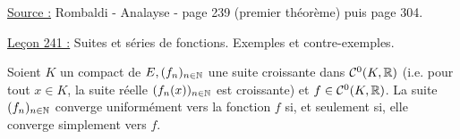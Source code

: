

\pagestyle{fancy}

\fancyhead[R]{}



\underline{Source :} Rombaldi - Analayse - page 239 (premier théorème) puis page 304. \newline

\underline{Leçon 241 :} Suites et séries de fonctions. Exemples et contre-exemples. \newline

\begin{thm}
\label{thm:Dini}
Soient $K$ un compact de $E, (f_n)_{n \in \mathbb{N}}$ une suite croissante dans $\mathcal{C}^0(K, \mathbb{R})$ 
(i.e. pour tout $x \in K$, la suite réelle $(f_n(x))_{n \in \mathbb{N}}$ est croissante) et $f \in \mathcal{C}^0(K, \mathbb{R})$. 
La suite $(f_n)_{n \in \mathbb{N}}$ converge uniformément vers la fonction $f$ si, et seulement si, elle converge simplement vers $f$.
\end{thm}

